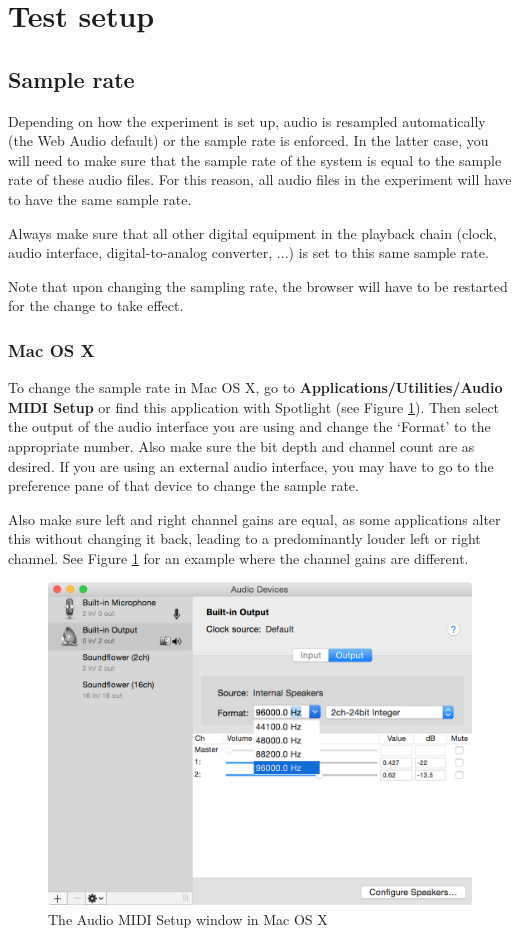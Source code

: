 \documentclass[11pt, oneside]{article}   	%
\begin{document}
\clearpage

\section{Test setup} %

	\subsection{Sample rate}
		Depending on how the experiment is set up, audio is resampled automatically (the Web Audio default) or the sample rate is enforced. In the latter case, you will need to make sure that the sample rate of the system is equal to the sample rate of these audio files. For this reason, all audio files in the experiment will have to have the same sample rate. 

		Always make sure that all other digital equipment in the playback chain (clock, audio interface, digital-to-analog converter, ...) is set to this same sample rate.

		Note that upon changing the sampling rate, the browser will have to be restarted for the change to take effect. 
		
		\subsubsection{Mac OS X}
			To change the sample rate in Mac OS X, go to \textbf{Applications/Utilities/Audio MIDI Setup} or find this application with Spotlight (see Figure \ref{fig:audiomidisetup}). Then select the output of the audio interface you are using and change the `Format' to the appropriate number. Also make sure the bit depth and channel count are as desired. 
			If you are using an external audio interface, you may have to go to the preference pane of that device to change the sample rate. 

			Also make sure left and right channel gains are equal, as some applications alter this without changing it back, leading to a predominantly louder left or right channel. See Figure \ref{fig:audiomidisetup} for an example where the channel gains are different. 

			\begin{figure}[tb]
				\centering
				\includegraphics[width=.65\textwidth]{img/audiomidisetup.png}
				\caption{The Audio MIDI Setup window in Mac OS X}
				\label{fig:audiomidisetup}
			\end{figure}
		
\end{document}
